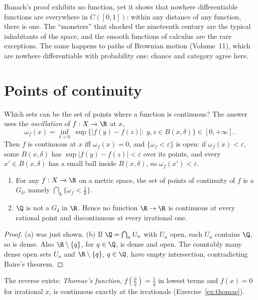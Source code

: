 \begin{beauty}
Banach's proof exhibits no function, yet it shows that nowhere differentiable functions are everywhere in $C([0,1])$: within
any distance of any function, there is one. The ``monsters'' that shocked the nineteenth century are the typical
inhabitants of the space, and the smooth functions of calculus are the rare exceptions. The same happens to paths of
Brownian motion (Volume~11), which are nowhere differentiable with probability one: chance and category agree here.
\end{beauty}

\section{Points of continuity}

Which sets can be the set of points where a function is continuous? The answer uses the \emph{oscillation} of $f:X\to\R$ at $x$,
\[\omega_f(x)=\inf_{\delta>0}\ \sup\{|f(y)-f(z)|:\ y,z\in B(x,\delta)\}\in[0,+\infty].\]
Then $f$ is continuous at $x$ iff $\omega_f(x)=0$, and $\{\omega_f<\varepsilon\}$ is open: if $\omega_f(x)<\varepsilon$, some $B(x,\delta)$ has $\sup|f(y)-f(z)|<\varepsilon$ over its points, and every
$x'\in B(x,\delta)$ has a small ball inside $B(x,\delta)$, so $\omega_f(x')<\varepsilon$.

\begin{proposition}\label{prop:continuitypoints}
\begin{enumerate}[label=(\alph*)]
\item For any $f:X\to\R$ on a metric space, the set of points of continuity of $f$ is a $G_\delta$, namely $\bigcap_k\{\omega_f<\frac1k\}$.
\item $\Q$ is not a $G_\delta$ in $\R$. Hence no function $\R\to\R$ is continuous at every rational point and discontinuous at every irrational one.
\end{enumerate}
\end{proposition}
\begin{proof}
(a) was just shown. (b) If $\Q=\bigcap_nU_n$ with $U_n$ open, each $U_n$ contains $\Q$, so is dense. Also $\R\setminus\{q\}$, for $q\in\Q$, is dense and open. The countably many
dense open sets $U_n$ and $\R\setminus\{q\}$, $q\in\Q$, have empty intersection, contradicting Baire's theorem.
\end{proof}

The reverse exists: \emph{Thomae's function}, $f(\frac pq)=\frac1q$ in lowest terms and $f(x)=0$ for irrational $x$, is continuous exactly at the irrationals
(Exercise~\ref{ex:thomae}).

